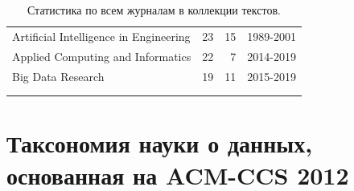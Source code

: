 \documentclass[12pt]{article}
\begin{document}
\begin{center}
{\begin{longtable}{lrrl}
			Artificial Intelligence in Engineering                                               &        23 &       15 & 1989-2001 \\
			Applied Computing and Informatics                                                    &        22 &        7 & 2014-2019 \\
			Big Data Research                                                                    &        19 &       11 & 2015-2019 \\
			\bottomrule \\
			\caption{Статистика по всем журналам в коллекции текстов.}
		\end{longtable}
	}
	\end{center}

\section{Таксономия науки о данных, основанная на ACM-CCS 2012}
\label{appendix:ds_taxonomy}
\end{document}
